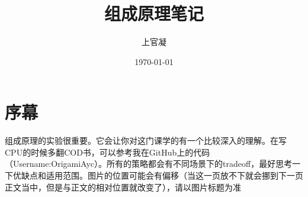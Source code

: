 \documentclass[]{report}
\title{组成原理笔记}
\author{上官凝}
\date{\today}
\begin{document}
	\theoremstyle{definition} \newtheorem{theorem}{Thm}[section] %
	\theoremstyle{definition} \newtheorem{definition}{Def}[section] %
	\theoremstyle{plain} \newtheorem{lemma}{lemma}[section] %

	\maketitle
	\newpage

	\tableofcontents
	\newpage

	\section{序幕}
	组成原理的实验很重要。它会让你对这门课学的有一个比较深入的理解。在写CPU的时候多翻COD书，可以参考我在GitHub上的代码（Username:OrigamiAyc）。所有的策略都会有不同场景下的tradeoff，最好思考一下优缺点和适用范围。图片的位置可能会有偏移（当这一页放不下就会挪到下一页正文当中，但是与正文的相对位置就改变了），请以图片标题为准
\end{document}
